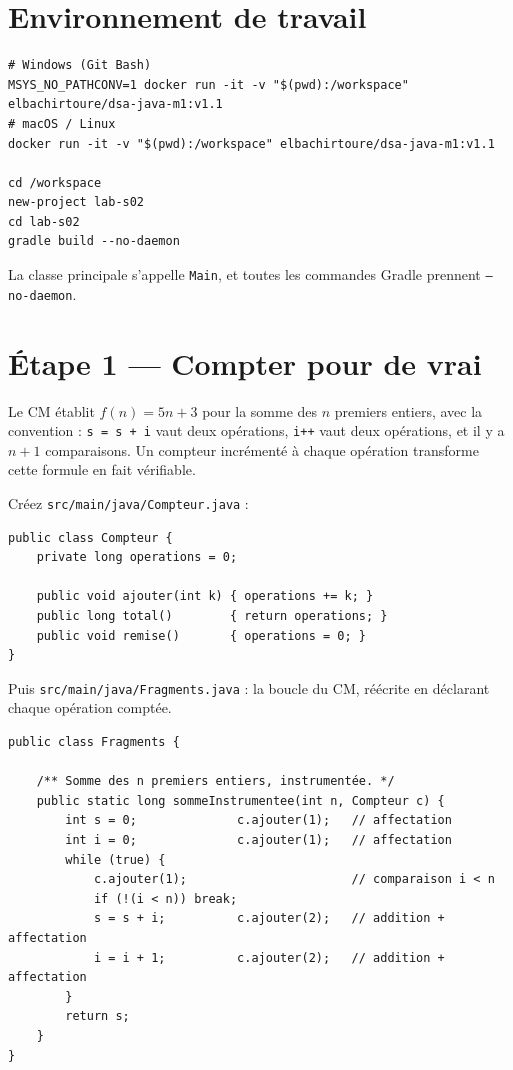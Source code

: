 \documentclass[11pt,a4paper]{article}
\begin{document}
\section{Environnement de travail}

\begin{lstlisting}[style=bash,caption={Rappel : lancer le conteneur et créer le projet}]
# Windows (Git Bash)
MSYS_NO_PATHCONV=1 docker run -it -v "$(pwd):/workspace" elbachirtoure/dsa-java-m1:v1.1
# macOS / Linux
docker run -it -v "$(pwd):/workspace" elbachirtoure/dsa-java-m1:v1.1

cd /workspace
new-project lab-s02
cd lab-s02
gradle build --no-daemon
\end{lstlisting}

\begin{attentionbox}
La classe principale s'appelle \texttt{Main}, et toutes les commandes
Gradle prennent \texttt{--no-daemon}.
\end{attentionbox}

\section{Étape 1 --- Compter pour de vrai}

\begin{lienbox}[Ce qu'on matérialise du CM]
Le CM établit $f(n) = 5n + 3$ pour la somme des $n$ premiers entiers, avec
la convention : \texttt{s = s + i} vaut deux opérations, \texttt{i++} vaut
deux opérations, et il y a $n+1$ comparaisons. Un compteur incrémenté à
chaque opération transforme cette formule en fait vérifiable.
\end{lienbox}

Créez \texttt{src/main/java/Compteur.java} :

\begin{lstlisting}[caption={\texttt{Compteur.java}}]
public class Compteur {
    private long operations = 0;

    public void ajouter(int k) { operations += k; }
    public long total()        { return operations; }
    public void remise()       { operations = 0; }
}
\end{lstlisting}

Puis \texttt{src/main/java/Fragments.java} : la boucle du CM, réécrite en
déclarant chaque opération comptée.

\begin{lstlisting}[caption={\texttt{Fragments.java} --- somme instrumentée}]
public class Fragments {

    /** Somme des n premiers entiers, instrumentée. */
    public static long sommeInstrumentee(int n, Compteur c) {
        int s = 0;              c.ajouter(1);   // affectation
        int i = 0;              c.ajouter(1);   // affectation
        while (true) {
            c.ajouter(1);                       // comparaison i < n
            if (!(i < n)) break;
            s = s + i;          c.ajouter(2);   // addition + affectation
            i = i + 1;          c.ajouter(2);   // addition + affectation
        }
        return s;
    }
}
\end{lstlisting}
\end{document}
